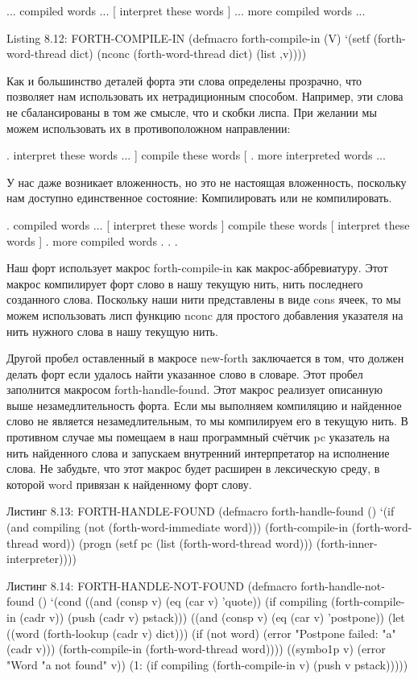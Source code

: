 ... compiled words ...
[ interpret these words ]
... more compiled words ...

Listing 8.12: FORTH-COMPILE-IN
(defmacro forth-compile-in (V)
‘(setf (forth-word-thread dict)
(nconc (forth-word-thread dict)
(list ,v))))

Как и большинство деталей форта эти слова определены прозрачно, что позволяет нам использовать их нетрадиционным способом. Например, эти слова не сбалансированы в том же смысле, что и скобки лиспа. При желании мы можем использовать их в противоположном направлении:

. interpret these words ...
] compile these words [
. more interpreted words ...

У нас даже возникает вложенность, но это не настоящая вложенность, поскольку нам доступно единственное состояние: Компилировать или не компилировать.

. compiled words ...
[ interpret these words
] compile these words [
interpret these words
]
. more compiled words . . .

Наш форт использует макрос forth-compile-in как макрос-аббревиатуру. Этот макрос компилирует форт слово в нашу текущую нить, нить последнего созданного слова. Поскольку наши нити представлены в виде cons ячеек, то мы можем использовать лисп функцию nconc для простого добавления указателя на нить нужного слова в нашу текущую нить.

Другой пробел оставленный в макросе new-forth заключается в том, что должен делать форт если удалось найти указанное слово в словаре. Этот пробел заполнится макросом forth-handle-found. Этот макрос реализует описанную выше незамедлительность форта. Если мы выполняем компиляцию и найденное слово не является незамедлительным, то мы компилируем его в текущую нить. В противном случае мы помещаем в наш программный счётчик pc указатель на нить найденного слова и запускаем внутренний интерпретатор на исполнение слова. Не забудьте, что этот макрос будет расширен в лексическую среду, в которой word привязан к найденному форт слову.

Листинг 8.13: FORTH-HANDLE-FOUND
(defmacro forth-handle-found ()
‘(if (and compiling
(not (forth-word-immediate word)))
(forth-compile-in (forth-word-thread word))
(progn
(setf pc (list (forth-word-thread word)))
(forth-inner-interpreter))))

Листинг 8.14: FORTH-HANDLE-NOT-FOUND
(defmacro forth-handle-not-found ()
‘(cond
((and (consp v) (eq (car v) ’quote))
(if compiling
(forth-compile-in (cadr v))
(push (cadr v) pstack)))
((and (consp v) (eq (car v) ’postpone))
(let ((word (forth-lookup (cadr v) dict)))
(if (not word)
(error "Postpone failed: "a" (cadr v)))
(forth-compile-in (forth-word-thread word))))
((symbo1p v)
(error "Word "a not found" v))
(1:
(if compiling
(forth-compile-in v)
(push v pstack)))))

